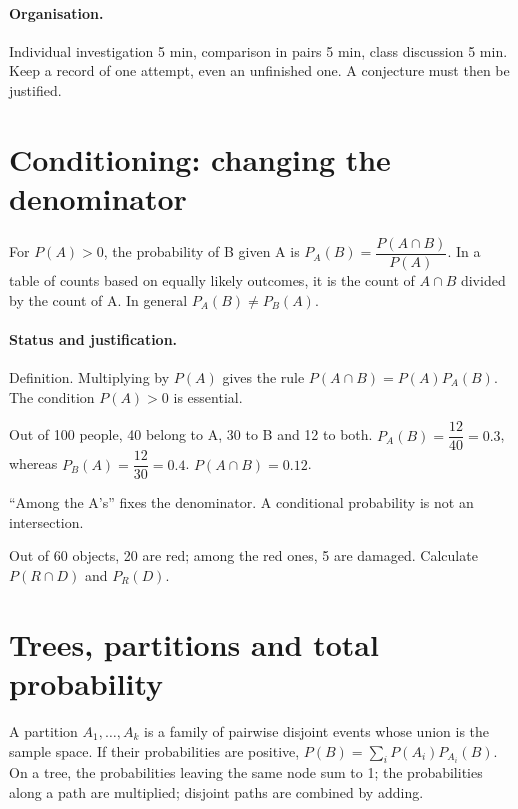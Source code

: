 \paragraph{Organisation.} Individual investigation 5 min, comparison in pairs 5 min, class discussion 5 min. Keep a record of one attempt, even an unfinished one. A conjecture must then be justified.
\mxnewpage
\section{Conditioning: changing the denominator}\label{C05-U1}
\begin{keypoint}
For $P(A)>0$, the probability of B given A is $P_A(B)=\dfrac{P(A\cap B)}{P(A)}$. In a table of counts based on equally likely outcomes, it is the count of $A\cap B$ divided by the count of A. In general $P_A(B)\ne P_B(A)$.
\end{keypoint}
\paragraph{Status and justification.} Definition. Multiplying by $P(A)$ gives the rule $P(A\cap B)=P(A)P_A(B)$. The condition $P(A)>0$ is essential.
\begin{example}Out of 100 people, 40 belong to A, 30 to B and 12 to both. $P_A(B)=\dfrac{12}{40}=\num{0,3}$, whereas $P_B(A)=\dfrac{12}{30}=\num{0,4}$. $P(A\cap B)=\num{0,12}$.\end{example}\label{C05-EX1}
\begin{pitfall}``Among the A's'' fixes the denominator. A conditional probability is not an intersection.\end{pitfall}
\begin{application}Out of 60 objects, 20 are red; among the red ones, 5 are damaged. Calculate $P(R\cap D)$ and $P_R(D)$.\end{application}\label{C05-AP1}
\section{Trees, partitions and total probability}\label{C05-U2}
\begin{keypoint}
A partition $A_1,\ldots,A_k$ is a family of pairwise disjoint events whose union is the sample space. If their probabilities are positive, $P(B)=\sum_iP(A_i)P_{A_i}(B)$. On a tree, the probabilities leaving the same node sum to 1; the probabilities along a path are multiplied; disjoint paths are combined by adding.
\end{keypoint}
